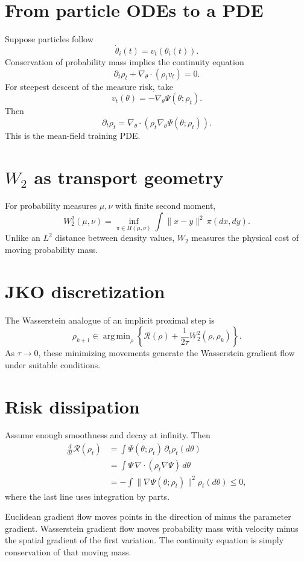 \documentclass[11pt,a4paper,oneside,openany]{memoir}
\DeclareMathOperator*{\argmin}{arg\,min}
\theoremstyle{definition}
\begin{document}
\section{From particle ODEs to a PDE}
Suppose particles follow
\[
\dot\theta_i(t)=v_t(\theta_i(t)).
\]
Conservation of probability mass implies the continuity equation
\[
\partial_t\rho_t+\nabla_\theta\cdot(\rho_t v_t)=0.
\]
For steepest descent of the measure risk, take
\[
v_t(\theta)=-\nabla_\theta\Psi(\theta;\rho_t).
\]
Then
\[
\boxed{\partial_t\rho_t
=\nabla_\theta\cdot\left(\rho_t\nabla_\theta\Psi(\theta;\rho_t)\right).}
\]
This is the mean-field training PDE.

\section{$W_2$ as transport geometry}
For probability measures $\mu,\nu$ with finite second moment,
\[
W_2^2(\mu,\nu)
=\inf_{\pi\in\Pi(\mu,\nu)}
\int\|x-y\|^2\,\pi(dx,dy).
\]
Unlike an $L^2$ distance between density values, $W_2$ measures the physical cost of moving probability mass.

\section{JKO discretization}
The Wasserstein analogue of an implicit proximal step is
\[
\rho_{k+1}
\in\argmin_\rho
\left\{
\mathcal R(\rho)+\frac{1}{2\tau}W_2^2(\rho,\rho_k)
\right\}.
\]
As $\tau\to0$, these minimizing movements generate the Wasserstein gradient flow under suitable conditions.

\section{Risk dissipation}
Assume enough smoothness and decay at infinity.  Then
\begin{align*}
\frac{d}{dt}\mathcal R(\rho_t)
&=\int \Psi(\theta;\rho_t)\,\partial_t\rho_t(d\theta)\\
&=\int \Psi\,\nabla\cdot(\rho_t\nabla\Psi)\,d\theta\\
&=-\int \|\nabla\Psi(\theta;\rho_t)\|^2\rho_t(d\theta)\le0,
\end{align*}
where the last line uses integration by parts.

\begin{presentbox}
Euclidean gradient flow moves points in the direction of minus the parameter gradient.  Wasserstein gradient flow moves probability mass with velocity minus the spatial gradient of the first variation.  The continuity equation is simply conservation of that moving mass.
\end{presentbox}
\end{document}
